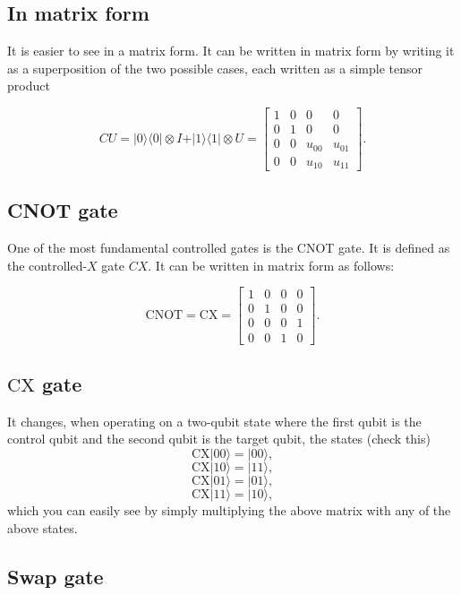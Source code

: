 \documentclass[%
oneside,                 %
final,                   %
10pt]{article}
\begin{document}
\subsection{In matrix form}

It is easier to see in a matrix form.
It can be written in matrix form by writing it as a superposition of
the two possible cases, each written as a simple tensor product

\[
CU = \vert 0\rangle\langle 0\vert\otimes I + \vert 1\rangle\langle 1 \vert \otimes U=\begin{bmatrix}
1 & 0 & 0 & 0 \\
0 & 1 & 0 & 0 \\
0 & 0 & u_{00} & u_{01} \\
0 & 0 & u_{10} & u_{11}
\end{bmatrix}.
\]

\subsection{CNOT gate}

One of the most fundamental controlled gates is the CNOT gate. It is
defined as the controlled-$X$ gate $CX$. It can be written in matrix form as follows:

\[
\mathrm{CNOT}=\mathrm{CX}=\begin{bmatrix}
1 & 0 & 0 & 0 \\
0 & 1 & 0 & 0 \\
0 & 0 & 0 & 1 \\
0 & 0 & 1 & 0
\end{bmatrix}.
\]

\subsection{$\mathrm{CX}$ gate}

It changes, when operating on a two-qubit state where the first qubit is the control qubit and the second qubit is the target qubit, the states (check this)
\[
\mathrm{CX}\vert 00\rangle=\vert 00\rangle,
\]
\[
\mathrm{CX}\vert 10\rangle= \vert 11\rangle,
\]
\[
\mathrm{CX}\vert 01\rangle= \vert 01\rangle,
\]
\[
\mathrm{CX}\vert 11\rangle= \vert 10\rangle,
\]
which you can easily see by simply multiplying the above matrix with any of the above states.

\subsection{Swap gate}
\end{document}
